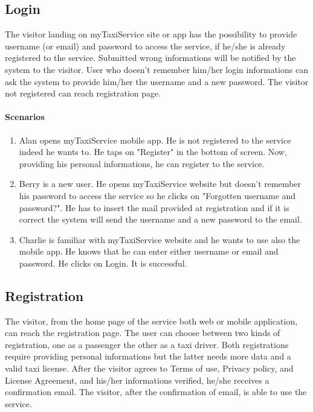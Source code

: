 \subsection{Login}
The visitor landing on myTaxiService site or app has the possibility to provide username (or email) and password to access the service, if he/she is already registered to the service. Submitted wrong informations will be notified by the system to the visitor. User who doesn't remember him/her login informations can ask the system to provide him/her the username and a new password. The visitor not registered can reach registration page.

\paragraph{Scenarios}
\begin{enumerate}
	\item Alan opens myTaxiService mobile app. He is not registered to the service indeed he wants to. He taps on "Register" in the bottom of screen. Now, providing his personal informations, he can register to the service.
	\item Berry is a new user. He opens myTaxiService website but doesn't remember his password to access the service so he clicks on "Forgotten username and password?". He has to insert the mail provided at registration and if it is correct the system will send the username and a new password to the email.
	\item Charlie is familiar with myTaxiService website and he wants to use also the mobile app. He knows that he can enter either username or email and password. He clicks on Login. It is successful.
\end{enumerate}

\subsection{Registration}
The visitor, from the home page of the service both web or mobile application, can reach the registration page. The user can choose between two kinds of registration, one as a passenger the other as a taxi driver. Both registrations require providing personal informations but the latter needs more data and a valid taxi license. After the visitor agrees to Terms of use, Privacy policy, and License Agreement, and his/her informations verified, he/she receives a confirmation email. The visitor, after the confirmation of email, is able to use the service.


